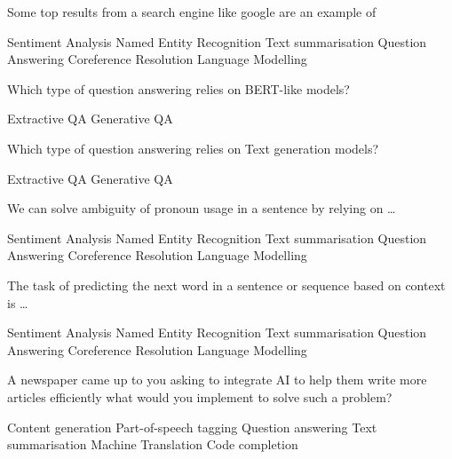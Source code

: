 \documentclass[theme=sleek, randomorder, hidesidemenu]{webquiz}
\begin{document}
\begin{question}
  Some top results from a search engine like google are an example of
  \begin{choice}
    \incorrect Sentiment Analysis
    \incorrect Named Entity Recognition
    \incorrect Text summarisation
    \correct Question Answering
    \incorrect Coreference Resolution
    \incorrect Language Modelling
  \end{choice}
\end{question}

\begin{question}
  Which type of question answering relies on BERT-like models?
  \begin{choice}
    \correct Extractive QA
    \incorrect Generative QA
  \end{choice}
\end{question}

\begin{question}
  Which type of question answering relies on Text generation models?
  \begin{choice}
    \incorrect Extractive QA
    \correct Generative QA
  \end{choice}
\end{question}

\begin{question}
  We can solve ambiguity of pronoun usage in a sentence by relying on \ldots
  \begin{choice}
    \incorrect Sentiment Analysis
    \incorrect Named Entity Recognition
    \incorrect Text summarisation
    \incorrect Question Answering
    \correct Coreference Resolution
    \incorrect Language Modelling
  \end{choice}
\end{question}

\begin{question}
  The task of predicting the next word in a sentence or sequence based on context is \ldots
  \begin{choice}
    \incorrect Sentiment Analysis
    \incorrect Named Entity Recognition
    \incorrect Text summarisation
    \incorrect Question Answering
    \incorrect Coreference Resolution
    \correct Language Modelling
  \end{choice}
\end{question}

\begin{question}
  A newspaper came up to you asking to integrate AI to help them write more articles efficiently what would you implement to solve such a problem?
  \begin{choice}
    \correct Content generation
    \incorrect Part-of-speech tagging
    \incorrect Question answering
    \incorrect Text summarisation
    \incorrect Machine Translation
    \incorrect Code completion
  \end{choice}
\end{question}
\end{document}
